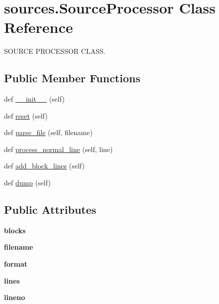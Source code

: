 \hypertarget{classsources_1_1_source_processor}{}\section{sources.\+Source\+Processor Class Reference}
\label{classsources_1_1_source_processor}


S\+O\+U\+R\+CE P\+R\+O\+C\+E\+S\+S\+OR C\+L\+A\+SS.  


\subsection*{Public Member Functions}
\begin{DoxyCompactItemize}
\item 
def \hyperlink{classsources_1_1_source_processor_a976a915b122b4e1eaae02ff140c04292}{\+\_\+\+\_\+init\+\_\+\+\_\+} (self)
\item 
def \hyperlink{classsources_1_1_source_processor_a367b849e7abce1219f2c14a9c8fda0ca}{reset} (self)
\item 
def \hyperlink{classsources_1_1_source_processor_ac3aa49eda144c4b855c84907d8f95c18}{parse\+\_\+file} (self, filename)
\item 
def \hyperlink{classsources_1_1_source_processor_a2b1c60d8bc9d94bb958e04019baafea3}{process\+\_\+normal\+\_\+line} (self, line)
\item 
def \hyperlink{classsources_1_1_source_processor_a461735ab30867f32d3e974ee8f2c255d}{add\+\_\+block\+\_\+lines} (self)
\item 
def \hyperlink{classsources_1_1_source_processor_a4b76f5fe5374cca4929e6d4fb6eb0e1f}{dump} (self)
\end{DoxyCompactItemize}
\subsection*{Public Attributes}
\begin{DoxyCompactItemize}
\item 
\mbox{\label{classsources_1_1_source_processor_a4c6a2a09b63a37de1c8f70d5cfd08bb1}} 
{\bfseries blocks}
\item 
\mbox{\label{classsources_1_1_source_processor_ab324c34e3a33bf2abec242df5407b690}} 
{\bfseries filename}
\item 
\mbox{\label{classsources_1_1_source_processor_a4613674ba9915139266f9a39a5d6295a}} 
{\bfseries format}
\item 
\mbox{\label{classsources_1_1_source_processor_adc4256e323f2766175075037a992a4f8}} 
{\bfseries lines}
\item 
\mbox{\label{classsources_1_1_source_processor_a3a18441a2fdf0feb1ac612f01263cee2}} 
{\bfseries lineno}
\end{DoxyCompactItemize}


